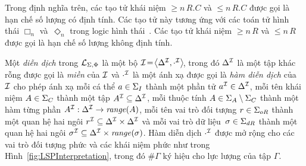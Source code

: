 Trong định nghĩa trên, các tạo tử khái niệm $\geq\!n\,R.C$ và $\leq\!n\,R.C$ được gọi là hạn chế số lượng có định tính. Các tạo tử này tương ứng với các toán tử hình thái $\Box_n$ và~$\Diamond_n$ trong logic hình thái~\cite{Montanari1997,Divroodi2011B}. Các tạo tử khái niệm $\geq\!n\,R$ và $\leq\!n\,R$ được gọi là hạn chế số lượng không định tính.

\begin{Definition}
\label{def:LSPInterpretation}
Một {\em diễn dịch} trong $\mathcal{L}_{\Sigma,\Phi}$ là một bộ \mbox{$\mathcal{I}\!=\! \left\langle\Delta^{\mathcal{I}}, \cdot^{\mathcal{I}}\right\rangle\!$}, trong đó $\Delta^{\mathcal{I}}$ là một tập khác rỗng được gọi là {\em miền} của $\mathcal{I}$ và $\cdot^{\mathcal{I}}$ là một ánh xạ được gọi là {\em hàm diễn dịch} của $\mathcal{I}$ cho phép ánh xạ mỗi cá thể $a \in \Sigma_I$ thành một phần tử $a^{\mathcal{I}} \in \Delta^{\mathcal{I}}$, mỗi tên khái niệm $A \in \Sigma_C$ thành một tập $A^{\mathcal{I}} \subseteq \Delta^{\mathcal{I}}$, mỗi thuộc tính $A \in \Sigma_A \setminus \Sigma_C$ thành một hàm từng phần $A^{\mathcal{I}} : \Delta^{\mathcal{I}} \to \mathit{range}(A)$, mỗi tên vai trò đối tượng $r \in \Sigma_{oR}$ thành một quan hệ hai ngôi $r^{\mathcal{I}} \subseteq \Delta^{\mathcal{I}} \times \Delta^{\mathcal{I}}$ và mỗi vai trò dữ liệu~$\sigma \in \Sigma_{dR}$ thành một quan hệ hai ngôi $\sigma^{\mathcal{I}} \subseteq \Delta^{\mathcal{I}} \times \mathit{range}(\sigma)$.
Hàm diễn dịch $\cdot^{\mathcal{I}}$ được mở rộng cho các vai trò đối tượng phức và các khái niệm phức như trong Hình~\ref{fig:LSPInterpretation}, trong đó $\#\Gamma$ ký hiệu cho lực lượng của tập $\Gamma$.\myend
\end{Definition}

